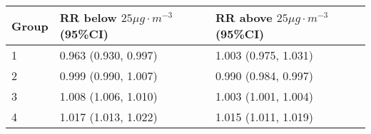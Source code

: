 \begin{tabular}{lll}
  \hline
Group & RR below $25 \mu g \cdot m^{-3}$ (95\%CI) & RR above $25 \mu g \cdot m^{-3}$ (95\%CI) \\ 
  \hline
   1 & 0.963 (0.930, 0.997) & 1.003 (0.975, 1.031) \\ 
     2 & 0.999 (0.990, 1.007) & 0.990 (0.984, 0.997) \\ 
     3 & 1.008 (1.006, 1.010) & 1.003 (1.001, 1.004) \\ 
     4 & 1.017 (1.013, 1.022) & 1.015 (1.011, 1.019) \\ 
   \hline
\end{tabular}

